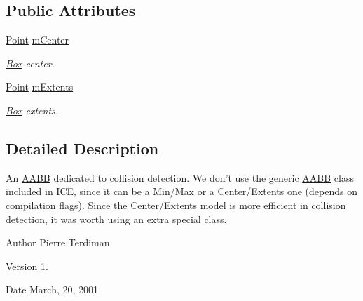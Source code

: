 \subsection*{Public Attributes}
\begin{DoxyCompactItemize}
\item 
\hypertarget{class_collision_a_a_b_b_a4be227d0bf648dcfefb6f8bb0cb7b4d3}{\hyperlink{class_point}{Point} \hyperlink{class_collision_a_a_b_b_a4be227d0bf648dcfefb6f8bb0cb7b4d3}{m\+Center}}\label{class_collision_a_a_b_b_a4be227d0bf648dcfefb6f8bb0cb7b4d3}

\begin{DoxyCompactList}\small\item\em \hyperlink{class_box}{Box} center. \end{DoxyCompactList}\item 
\hypertarget{class_collision_a_a_b_b_a8c66d75004d57c817e73fe16e263e87d}{\hyperlink{class_point}{Point} \hyperlink{class_collision_a_a_b_b_a8c66d75004d57c817e73fe16e263e87d}{m\+Extents}}\label{class_collision_a_a_b_b_a8c66d75004d57c817e73fe16e263e87d}

\begin{DoxyCompactList}\small\item\em \hyperlink{class_box}{Box} extents. \end{DoxyCompactList}\end{DoxyCompactItemize}


\subsection{Detailed Description}
An \hyperlink{class_a_a_b_b}{A\+A\+B\+B} dedicated to collision detection. We don't use the generic \hyperlink{class_a_a_b_b}{A\+A\+B\+B} class included in I\+C\+E, since it can be a Min/\+Max or a Center/\+Extents one (depends on compilation flags). Since the Center/\+Extents model is more efficient in collision detection, it was worth using an extra special class.

\begin{DoxyAuthor}{Author}
Pierre Terdiman 
\end{DoxyAuthor}
\begin{DoxyVersion}{Version}
1. 
\end{DoxyVersion}
\begin{DoxyDate}{Date}
March, 20, 2001 
\end{DoxyDate}


